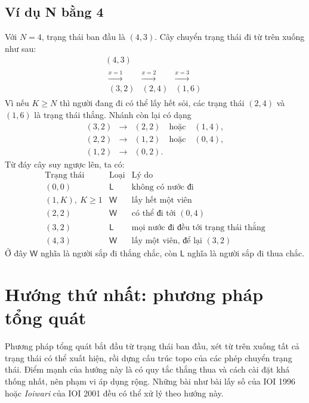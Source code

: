 \documentclass[11pt]{article}
\newcommand{\Win}{\mathsf{W}}
\newcommand{\Lose}{\mathsf{L}}
\begin{document}
\subsection{Ví dụ N bằng 4}

Với \(N=4\), trạng thái ban đầu là \((4,3)\). Cây chuyển trạng thái đi từ
trên xuống như sau:
\[
\begin{array}{c}
(4,3)\\[0.4em]
\begin{array}{ccc}
\xrightarrow{x=1} & \xrightarrow{x=2} & \xrightarrow{x=3}\\[-0.2em]
(3,2) & (2,4) & (1,6)
\end{array}
\end{array}
\]
Vì nếu \(K\ge N\) thì người đang đi có thể lấy hết sỏi, các trạng thái
\((2,4)\) và \((1,6)\) là trạng thái thắng. Nhánh còn lại có dạng
\[
\begin{array}{rcl}
(3,2) &\to& (2,2)\quad\text{hoặc}\quad (1,4),\\
(2,2) &\to& (1,2)\quad\text{hoặc}\quad (0,4),\\
(1,2) &\to& (0,2).
\end{array}
\]
Từ đáy cây suy ngược lên, ta có:
\[
\begin{array}{c|c|l}
\text{Trạng thái} & \text{Loại} & \text{Lý do}\\ \hline
(0,0) & \Lose & \text{không có nước đi}\\
(1,K),\ K\ge 1 & \Win & \text{lấy hết một viên}\\
(2,2) & \Win & \text{có thể đi tới }(0,4)\\
(3,2) & \Lose & \text{mọi nước đi đều tới trạng thái thắng}\\
(4,3) & \Win & \text{lấy một viên, để lại }(3,2)
\end{array}
\]
Ở đây \(\Win\) nghĩa là người sắp đi thắng chắc, còn \(\Lose\) nghĩa là người
sắp đi thua chắc.

\section{Hướng thứ nhất: phương pháp tổng quát}

Phương pháp tổng quát bắt đầu từ trạng thái ban đầu, xét từ trên xuống tất cả
trạng thái có thể xuất hiện, rồi dựng cấu trúc topo của các phép chuyển trạng
thái. Điểm mạnh của hướng này là có quy tắc thắng thua và cách cài đặt khá
thống nhất, nên phạm vi áp dụng rộng. Những bài như bài lấy số của IOI 1996
hoặc \textit{Ioiwari} của IOI 2001 đều có thể xử lý theo hướng này.
\end{document}
